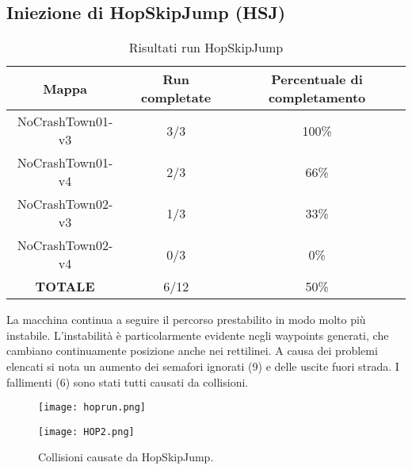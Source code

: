 \subsection{Iniezione di HopSkipJump (HSJ)}
\begin{table}[h]
    \begin{tabular}{|c|c|c|}
        \hline
        Mappa                   & Run completate & Percentuale di completamento\\
        \hline
        NoCrashTown01-v3        & 3/3            & 100\% \\
        NoCrashTown01-v4        & 2/3            & 66\% \\
        NoCrashTown02-v3        & 1/3            & 33\% \\
        NoCrashTown02-v4        & 0/3            & 0\%  \\
        \hline
        \textbf{TOTALE}                  & 6/12           & 50\% \\
        \hline
    \end{tabular}
    \caption{Risultati run HopSkipJump}
    \label{tab:hsj}
\end{table}
La macchina continua a seguire il percorso prestabilito in modo molto più instabile. L'instabilità è particolarmente evidente negli waypoints generati, che cambiano continuamente posizione anche nei rettilinei. A causa dei problemi elencati
si nota un aumento dei semafori ignorati (9) e delle uscite fuori strada. I fallimenti (6) sono stati tutti causati da collisioni.
\begin{figure}[h]
    \centering
    \parbox{6cm}{
    \texttt{[image: hoprun.png]}
    \label{fig:hop1}}
    \qquad
    \begin{minipage}{6cm}
    \texttt{[image: HOP2.png]}
    \label{fig:hop2}
    \end{minipage}
    \caption{Collisioni causate da HopSkipJump.}
    \label{fig:hoprun}
    \end{figure}
\newpage

